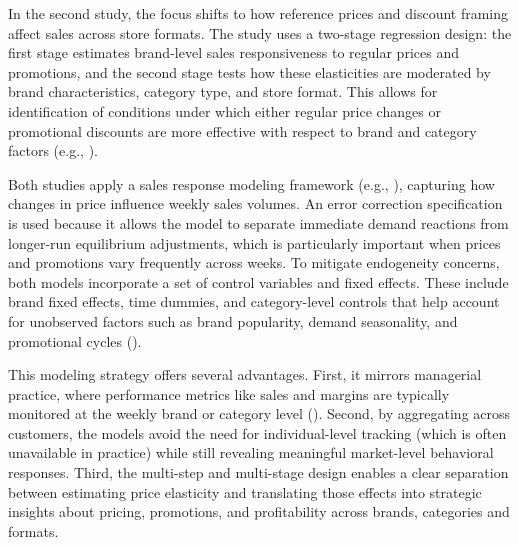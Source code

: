 In the second study, the focus shifts to how reference prices and discount framing affect sales across store formats. The study uses a two-stage regression design: the first stage estimates brand-level sales responsiveness to regular prices and promotions, and the second stage tests how these elasticities are moderated by brand characteristics, category type, and store format. This allows for identification of conditions under which either regular price changes or promotional discounts are more effective with respect to brand and category factors (e.g., \cite{Datta2022-fz,Haans2011-cv,Pauwels2007-ky}).

Both studies apply a sales response modeling framework (e.g., \cite{Pauwels2007-ky}), capturing how changes in price influence weekly sales volumes. An error correction specification is used because it allows the model to separate immediate demand reactions from longer-run equilibrium adjustments, which is particularly important when prices and promotions vary frequently across weeks. To mitigate endogeneity concerns, both models incorporate a set of control variables and fixed effects. These include brand fixed effects, time dummies, and category-level controls that help account for unobserved factors such as brand popularity, demand seasonality, and promotional cycles (\cite{Datta2022-fz}).

This modeling strategy offers several advantages. First, it mirrors managerial practice, where performance metrics like sales and margins are typically monitored at the weekly brand or category level (\cite{Widdecke2022-xo}). Second, by aggregating across customers, the models avoid the need for individual-level tracking (which is often unavailable in practice) while still revealing meaningful market-level behavioral responses. Third, the multi-step and multi-stage design enables a clear separation between estimating price elasticity and translating those effects into strategic insights about pricing, promotions, and profitability across brands, categories and formats.

